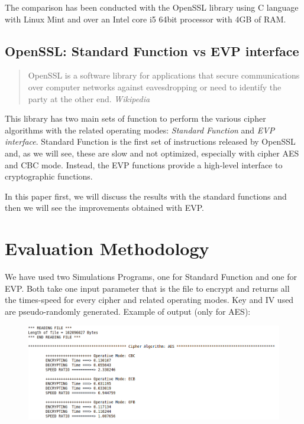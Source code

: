 \documentclass[11pt]{article}
\begin{document}
The comparison has been conducted with the OpenSSL library using C language with Linux Mint and over an Intel core i5 64bit processor with 4GB of RAM.

\subsection{OpenSSL: Standard Function vs EVP interface}
\begin{quote}
OpenSSL is a software library for applications that secure communications over computer networks against eavesdropping or need to identify the party at the other end. {\em Wikipedia}
\end{quote}
This library has two main sets of function to perform the various cipher algorithms with the related operating modes: 
{\em Standard Function} and {\em EVP interface}. Standard Function is the first set of instructions released by OpenSSL and, as we will see, these are slow and not optimized, especially with cipher AES and CBC mode. Instead, the EVP functions provide a high-level interface to cryptographic functions. 

In this paper first, we will discuss the results with the standard functions and then we will see the improvements obtained with EVP.

\section{Evaluation Methodology}
We have used two Simulations Programs, one for Standard Function and one for EVP. Both take one input parameter that is the file to encrypt and returns all the times-speed for every cipher and related operating modes. Key and IV used are pseudo-randomly generated. Example of output (only for AES):

\begin{figure}[!ht]
  \includegraphics[width=1\textwidth]{pic1-hw1-1635747}
  \label{fig:Example of output with EVP}
\end{figure}
\end{document}
